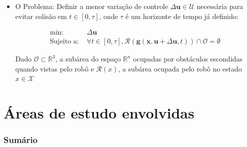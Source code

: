 \documentclass{beamer}
\begin{document}
\begin{frame}[allowframebreaks]
\begin{itemize}
		
		\item O Problema: Definir a menor variação de controle $\Delta\mathbf{u} \in \mathcal{U}$ necessária para evitar colisão em $t \in [0,\tau]$, onde $\tau$ é um horizonte de tempo já definido:
		
		\begin{equation}
		\begin{aligned}
		\text{min: }& \Delta\mathbf{u} \\
		\text{Sujeito a: }& \forall t \in [0,\tau], \mathcal{R}(\mathbf{g}(\mathbf{x}, \mathbf{u}+\Delta\mathbf{u}, t)) \cap \mathcal{O} = \emptyset
		\end{aligned}
		\label{eq:equacaoProb}
		\end{equation}
		
		Dado $\mathcal{O} \subset \mathbb{R}^3$, a subárea do espaço $\mathbb{R}^n$ ocupadas por obstáculos escondidas quando vistas pelo robô e $\mathcal{R}(x)$, a subárea ocupada pelo robô no estado $x \in \mathcal{X}$
		
		
		
	\end{itemize}	 
\end{frame}

\section{Áreas de estudo envolvidas}

\begin{frame}
	\frametitle{Sumário}
	\tableofcontents[currentsection]
\end{frame}
\end{document}
